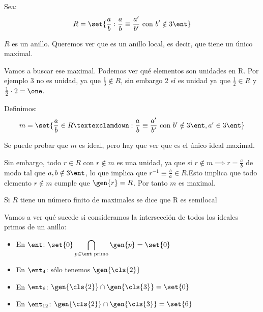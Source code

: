 \begin{example}
 Sea:
 $$ R=\set{ \frac{a}{b} : \frac{a}{b}\equiv \frac{a'}{b'} \text{ con } b' \notin 3\ent } $$

$R$ es un anillo. Queremos ver que es un anillo local, es decir, que tiene un único maximal.

Vamos a buscar ese maximal. Podemos ver qué elementos son unidades en R. Por ejemplo 3 no es unidad, ya que $\frac{1}{3} \notin R$, sin embargo 2 sí es unidad ya que $\frac{1}{2} \in R$ y $\frac{1}{2}\cdot 2 = \one$.

Definimos:
$$ m = \set{\frac{a}{b} \in R ¡: \frac{a}{b} \equiv \frac{a'}{b'}\text{ con }b'\notin 3\ent, a' \in 3\ent }$$

Se puede probar que $m$ es ideal, pero hay que ver que es el único ideal maximal.

Sin embargo, todo $r\in R$ con $r \notin m$ es una unidad, ya que si $r \notin m \implies r=\frac{a}{b}$ de modo tal que $a,b\notin 3\ent$, lo que implica que $r^{-1}\equiv \frac{b}{a} \in R$.Esto implica que todo elemento $r \notin m$ cumple que $\gen{r} =R$. Por tanto $m$ es maximal.
\end{example}

\begin{defn}
 Si $R$ tiene un número finito de maximales se dice que R es semilocal
\end{defn}

Vamos a ver qué sucede si consideramos la intersección de todos los ideales primos de un anillo:
\begin{example}
	\begin{itemize}
		\item En $\ent$: $\displaystyle\set{0} \bigcap_{p\in \ent\text{ primo}}\gen{p}=\set{0}$
		\item En $\ent_4$: sólo tenemos $\gen{\cls{2}}$
		\item En $\ent_6$: $\gen{\cls{2}}\cap\gen{\cls{3}}=\set{0}$
		\item En $\ent_{12}$: $\gen{\cls{2}}\cap\gen{\cls{3}}=\set{6}$
	\end{itemize}
\end{example}

